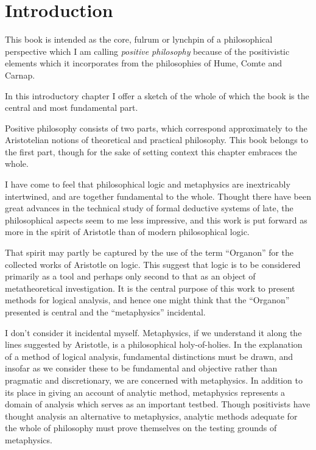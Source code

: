 \chapter{Introduction}\label{Introduction}

This book is intended as the core, fulrum or lynchpin of a
philosophical perspective which I am calling \emph{positive
  philosophy} because of the positivistic elements which it
incorporates from the philosophies of Hume, Comte and Carnap.

In this introductory chapter I offer a sketch of the whole of which
the book is the central and most fundamental part.

Positive philosophy consists of two parts, which correspond
approximately to the Aristotelian notions of theoretical and
practical philosophy.
This book belongs to the first part, though for the sake of setting
context this chapter embraces the whole.

I have come to feel that philosophical logic and metaphysics are
inextricably intertwined, and are together fundamental to the whole.
Thought there have been great advances in the technical study of
formal deductive systems of late, the philosophical aspects seem to me
less impressive, and this work is put forward as more in the spirit of
Aristotle than of modern philosophical logic.

That spirit may partly be captured by the use of the term ``Organon''
for the collected works of Aristotle on logic.
This suggest that logic is to be considered primarily as a tool and
perhaps only second to that as an object of metatheoretical
investigation.
It is the central purpose of this work to present methods for logical
analysis, and hence one might think that the ``Organon'' presented is
central and the ``metaphysics'' incidental.

I don't consider it incidental myself.
Metaphysics, if we understand it along the lines suggested by
Aristotle, is a philosophical holy-of-holies.
In the explanation of a method of logical analysis, fundamental
distinctions must be drawn, and insofar as we consider these to be
fundamental and objective rather than pragmatic and discretionary, we
are concerned with metaphysics.
In addition to its place in giving an account of analytic method,
metaphysics represents a domain of analysis which serves as an
important testbed.
Though positivists have thought analysis an alternative to
metaphysics, analytic methods adequate for the whole of philosophy
must prove themselves on the testing grounds of metaphysics.

